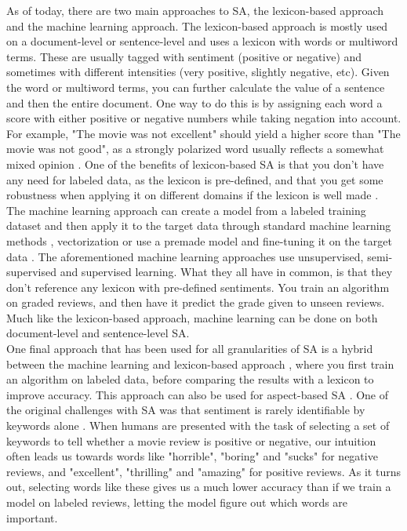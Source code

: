 \documentclass{report}
\begin{document}
As of today, there are two main approaches to SA, the lexicon-based approach and the machine learning approach. The lexicon-based approach is mostly used on a document-level or sentence-level and uses a lexicon with words or multiword terms. These are usually tagged with sentiment (positive or negative) and sometimes with different intensities (very positive, slightly negative, etc). Given the word or multiword terms, you can further calculate the value of a sentence and then the entire document. One way to do this is by assigning each word a score with either positive or negative numbers while taking negation into account. For example, "The movie was not excellent" should yield a higher score than "The movie was not good", as a strongly polarized word usually reflects a somewhat mixed opinion \cite{taboada-etal-2011-lexicon}. One of the benefits of lexicon-based SA is that you don't have any need for labeled data, as the lexicon is pre-defined, and that you get some robustness when applying it on different domains if the lexicon is well made \cite{taboada-etal-2011-lexicon}.\\
The machine learning approach can create a model from a labeled training dataset and then apply it to the target data through standard machine learning methods \cite{pang-etal-2002-thumbs}, vectorization \cite{Peters:2018, mikolov2013efficient, pennington2014glove} or use a premade model and fine-tuning it on the target data \cite{DBLP:journals/corr/abs-1810-04805}. The aforementioned machine learning approaches use unsupervised, semi-supervised and supervised learning. What they all have in common, is that they don't reference any lexicon with pre-defined sentiments. You train an algorithm on graded reviews, and then have it predict the grade given to unseen reviews. Much like the lexicon-based approach, machine learning can be done on both document-level and sentence-level SA.\\
One final approach that has been used for all granularities of SA is a hybrid between the machine learning and lexicon-based approach \cite{zhang2011combining}, where you first train an algorithm on labeled data, before comparing the results with a lexicon to improve accuracy. This approach can also be used for aspect-based SA \cite{brun2016xrce}.
One of the original challenges with SA was that sentiment is rarely identifiable by keywords alone \cite{pang-etal-2002-thumbs}. When humans are presented with the task of selecting a set of keywords to tell whether a movie review is positive or negative, our intuition often leads us towards words like "horrible", "boring" and "sucks" for negative reviews, and "excellent", "thrilling" and "amazing" for positive reviews. As it turns out, selecting words like these gives us a much lower accuracy than if we train a model on labeled reviews, letting the model figure out which words are important.
\end{document}
